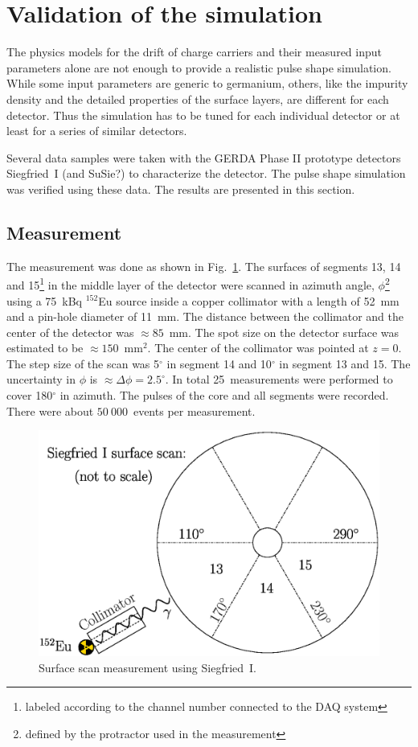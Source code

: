 \documentclass[epj]{svjour}
\begin{document}
\section{Validation of the simulation}
\label{s:psv}
The physics models \cite{miha,bart} for the drift of charge carriers
and their measured input parameters \cite{miha,reg,bart} alone are not
enough to provide a realistic pulse shape simulation. While some input
parameters are generic to germanium, others, like the impurity density
and the detailed properties of the surface layers, are different for
each detector. Thus the simulation has to be tuned for each individual
detector or at least for a series of similar detectors.

Several data samples were taken with the GERDA Phase II prototype
detectors Siegfried~I \cite{si} (and SuSie?) to characterize the
detector. The pulse shape simulation was verified using these
data. The results are presented in this section.

\subsection{Measurement}
\label{s:char}
The measurement was done as shown in Fig.~\ref{f:siscan}. The surfaces
of segments 13, 14 and 15\footnote{labeled according to the channel
number connected to the DAQ system} in the middle layer of the
detector were scanned in azimuth angle, $\phi$\footnote{defined by the
protractor used in the measurement} using a 75~kBq $^{152}$Eu source
inside a copper collimator with a length of 52~mm and a pin-hole
diameter of 11~mm. The distance between the collimator and the center
of the detector was $\approx 85$~mm. The spot size on the detector
surface was estimated to be $\approx 150$~mm$^{2}$. The center of the
collimator was pointed at $z = 0$. The step size of the scan was
5$^{\circ}$ in segment 14 and 10$^{\circ}$ in segment 13 and 15. The
uncertainty in $\phi$ is $\approx \Delta \phi=2.5^{\circ}$. In total
25~measurements were performed to cover 180$^{\circ}$ in azimuth. The
pulses of the core and all segments were recorded. There were about
$50\ 000$~events per measurement.
\begin{figure}[htbp]
\centering
\includegraphics[width=0.8\linewidth]{siscan}
\caption{Surface scan measurement using Siegfried~I.}
\label{f:siscan}
\end{figure}
\end{document}
